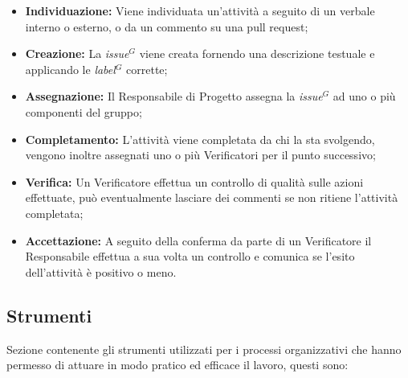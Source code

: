         \begin{itemize}
            \item \textbf{Individuazione:} Viene individuata un'attività a seguito di un verbale interno o esterno, o da un commento su una pull request;
            \item \textbf{Creazione:} La \emph{issue}$^{G}$ viene creata fornendo una descrizione testuale e applicando le \emph{label}$^{G}$ corrette;
            \item \textbf{Assegnazione:} Il Responsabile di Progetto assegna la \emph{issue}$^{G}$ ad uno o più componenti del gruppo;
            \item \textbf{Completamento:} L'attività viene completata da chi la sta svolgendo, vengono inoltre assegnati uno o più Verificatori per il punto successivo;
            \item \textbf{Verifica:} Un Verificatore effettua un controllo di qualità sulle azioni effettuate, può eventualmente lasciare dei commenti se non ritiene l'attività completata;
            \item \textbf{Accettazione:} A seguito della conferma da parte di un Verificatore il Responsabile effettua a sua volta un controllo e comunica se l'esito dell'attività è positivo o meno.
        \end{itemize}

        \subsection{Strumenti}

        Sezione contenente gli strumenti utilizzati per i processi organizzativi che hanno permesso di attuare in modo pratico ed efficace il lavoro, questi sono:

